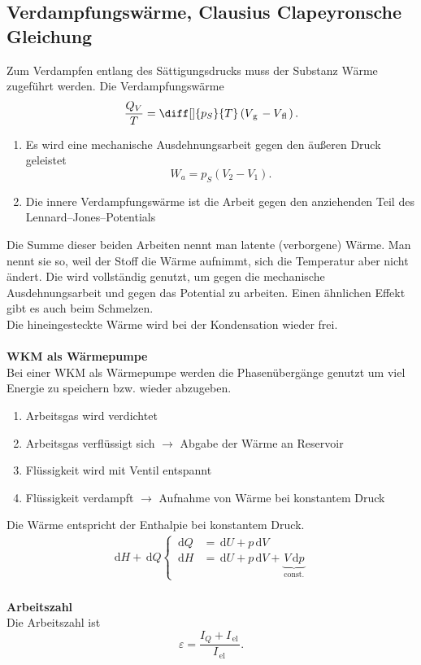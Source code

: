 \documentclass[a4paper,12pt]{article}
\newcommand{\td}{\,\text{d}}
\begin{document}
\subsection{Verdampfungswärme, Clausius Clapeyronsche Gleichung}
Zum Verdampfen entlang des Sättigungsdrucks muss der Substanz Wärme zugeführt werden. Die Verdampfungswärme
\[ 
        \dfrac{Q_V}{T}=\diff[]{p_S}{T}\left(V_{\,\text{g}\,}-V_{\,\text{fl}\,}\right)
.\] 
\begin{enumerate}[label=\arabic*.]
        \item Es wird eine mechanische Ausdehnungsarbeit gegen den äußeren Druck geleistet
                \[ 
                        W_a=p_S(V_2-V_1)
                .\] 
        \item Die innere Verdampfungswärme ist die Arbeit gegen den anziehenden Teil des Lennard--Jones--Potentials
\end{enumerate}
Die Summe dieser beiden Arbeiten nennt man latente (verborgene) Wärme. Man nennt sie so, weil der Stoff die Wärme aufnimmt, sich die Temperatur aber nicht ändert. Die wird vollständig genutzt, um gegen die mechanische Ausdehnungsarbeit und gegen das Potential zu arbeiten. Einen ähnlichen Effekt gibt es auch beim Schmelzen.\\\indent
Die hineingesteckte Wärme wird bei der Kondensation wieder frei.
\\\hfill\\\textbf{WKM als Wärmepumpe}\\ 
Bei einer WKM als Wärmepumpe werden die Phasenübergänge genutzt um viel Energie zu speichern bzw. wieder abzugeben.
\begin{enumerate}[label=\arabic*.]
        \item Arbeitsgas wird verdichtet
        \item Arbeitsgas verflüssigt sich $\rightarrow $ Abgabe der Wärme an Reservoir
        \item Flüssigkeit wird mit Ventil entspannt
        \item Flüssigkeit verdampft $\rightarrow $ Aufnahme von Wärme bei konstantem Druck
\end{enumerate}
Die Wärme entspricht der Enthalpie bei konstantem Druck.
\begin{align*}
        \td H+\td Q\begin{cases}
                \td Q&=\td U+p\td V\\
                \td H&=\td U+p\td V+\underbrace{V\td p}_{\,\text{const.}\,}
        \end{cases}
\end{align*}
\hfill\\\textbf{Arbeitszahl}\\ 
Die Arbeitszahl ist
\[ 
        \varepsilon =\dfrac{I_Q+I_{\,\text{el}\,}}{I_{\,\text{el}\,}}
.\] 
\end{document}
